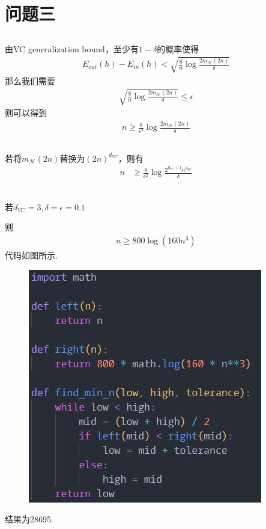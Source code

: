 \documentclass[12pt, a4paper]{article}
\begin{document}
\section{问题三}

\subsection{}

由VC generalization bound，至少有$1-\delta$的概率使得
\begin{align*}
    E_{out}(h)-E_{in}(h)<\sqrt{\frac{8}{n}\log\frac{2m_{\mathcal{H}}(2n)}{\delta}}
\end{align*}
那么我们需要
\begin{align*}
    \sqrt{\frac{8}{n}\log\frac{2m_{\mathcal{H}}(2n)}{\delta}} \leq \epsilon
\end{align*}
则可以得到
\begin{align*}
    n \geq \frac{8}{\epsilon^2}\log\frac{2m_{\mathcal{H}}(2n)}{\delta}
\end{align*}

\subsection{}

若将$m_{\mathcal{H}}(2n)$替换为$(2n)^{d_{VC}}$，则有
\begin{align*}
    n &\geq \frac{8}{\epsilon^2}\log\frac{2^{d_{VC}+1} n^{d_{VC}}}{\delta}\\
\end{align*}

\subsection{}

若$d_{VC}=3, \delta=\epsilon=0.1$

则
\begin{align*}
    n \geq 800 \log(160n^3)
\end{align*}
代码如图所示.
\begin{figure}
    \centering
    \includegraphics{img/a3_1.jpg}
\end{figure}
结果为28695.
\end{document}
